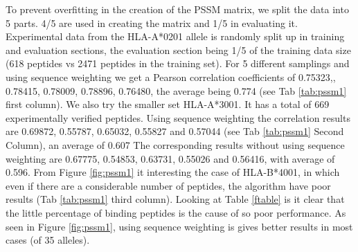 To prevent overfitting in the creation of the PSSM matrix, we split the data into 5 parts. 4/5 are used in creating the matrix and 1/5 in evaluating it.
Experimental data from the HLA-A*0201 allele is randomly split up in training and evaluation sections, the evaluation section being 1/5 of the training data size (618 peptides vs 2471 peptides in the training set).
For 5 different samplings and using sequence weighting we get a Pearson correlation coefficients of {0.75323,, 0.78415, 0.78009, 0.78896, 0.76480}, the average being 0.774 (see Tab \ref{tab:pssm1} first column).
We also try the smaller set HLA-A*3001. It has a total of 669 experimentally verified peptides.
Using sequence weighting the correlation results are 0.69872, 0.55787, 0.65032, 0.55827 and 0.57044 (see Tab \ref{tab:pssm1} Second Column), an average of 0.607
The corresponding results without using sequence weighting are 0.67775, 0.54853, 0.63731, 0.55026 and 0.56416, with average of 0.596.
From Figure \ref{fig:pssm1} it interesting the case of HLA-B*4001, in which even if there are a considerable number of peptides, the algorithm have poor results (Tab \ref{tab:pssm1} third column). Looking at Table \ref{ftable} is it clear that the little percentage of binding peptides is the cause of so poor performance. 
As seen in Figure \ref{fig:pssm1}, using sequence weighting is gives better results in most cases (of 35 alleles).

